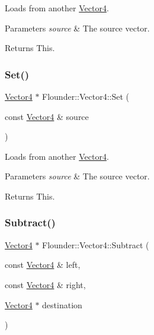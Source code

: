 Loads from another \hyperlink{class_flounder_1_1_vector4}{Vector4}. 


\begin{DoxyParams}{Parameters}
{\em source} & The source vector. \\
\hline
\end{DoxyParams}
\begin{DoxyReturn}{Returns}
This. 
\end{DoxyReturn}
\mbox{\label{class_flounder_1_1_vector4_ae966c1d652aec7571beb9407ed106ddc}} 
\subsubsection{\texorpdfstring{Set()}{Set()}\hspace{0.1cm}{\footnotesize\ttfamily [3/3]}}
{\footnotesize\ttfamily \hyperlink{class_flounder_1_1_vector4}{Vector4} $\ast$ Flounder\+::\+Vector4\+::\+Set (\begin{DoxyParamCaption}\item[{const \hyperlink{class_flounder_1_1_vector4}{Vector4} \&}]{source }\end{DoxyParamCaption})}



Loads from another \hyperlink{class_flounder_1_1_vector4}{Vector4}. 


\begin{DoxyParams}{Parameters}
{\em source} & The source vector. \\
\hline
\end{DoxyParams}
\begin{DoxyReturn}{Returns}
This. 
\end{DoxyReturn}
\mbox{\label{class_flounder_1_1_vector4_a4813a0817cc526aa51c2a84e8269647b}} 
\subsubsection{\texorpdfstring{Subtract()}{Subtract()}}
{\footnotesize\ttfamily \hyperlink{class_flounder_1_1_vector4}{Vector4} $\ast$ Flounder\+::\+Vector4\+::\+Subtract (\begin{DoxyParamCaption}\item[{const \hyperlink{class_flounder_1_1_vector4}{Vector4} \&}]{left,  }\item[{const \hyperlink{class_flounder_1_1_vector4}{Vector4} \&}]{right,  }\item[{\hyperlink{class_flounder_1_1_vector4}{Vector4} $\ast$}]{destination }\end{DoxyParamCaption})\hspace{0.3cm}{\ttfamily [static]}}



